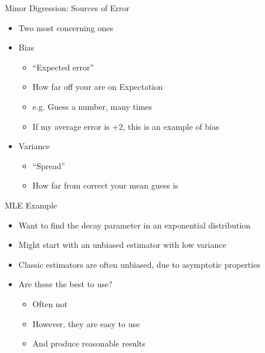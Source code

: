 \documentclass[aspectratio=169]{beamer}
\begin{document}
\begin{frame}{Minor Digression: Sources of Error}

\begin{itemize}
\item Two most concerning ones
\item Bias
	\begin{itemize}
	\item ``Expected error''
	\item How far off your are on Expectation
	\item e.g. Guess a number, many times
	\item If my average error is +2, this is an example of bias
	\end{itemize}
\item Variance
	\begin{itemize}
	\item ``Spread''
	\item How far from correct your mean guess is
	\end{itemize}
\end{itemize}
\end{frame}
\begin{frame}{MLE Example}

\begin{itemize}
\item Want to find the decay parameter in an exponential distribution
\item Might start with an unbiased estimator with low variance
\item Classic estimators are often unbiased, due to asymptotic properties
\item Are these the best to use?
\begin{itemize}
\item Often not
\item However, they are easy to use 
\item And produce reasonable results
\end{itemize}
\end{itemize}

\end{frame}
\end{document}

